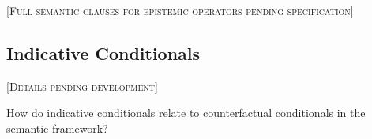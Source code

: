 \documentclass[../LogosReference.tex]{subfiles}
\begin{document}
\textsc{[Full semantic clauses for epistemic operators pending specification]}


\subsection{Indicative Conditionals}\label{sec:indicative-conditionals}

\textsc{[Details pending development]}

\begin{question}
How do indicative conditionals relate to counterfactual conditionals in the semantic framework?
\end{question}
\end{document}
